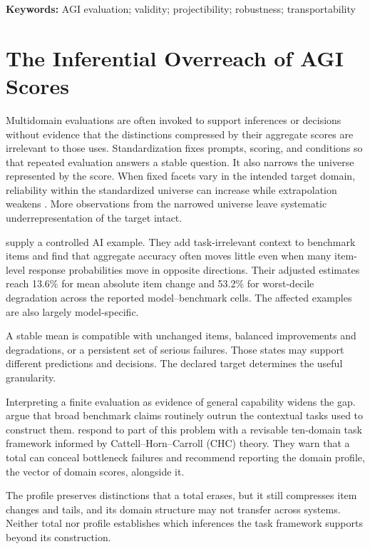 \documentclass[12pt]{article}
\begin{document}
\noindent\textbf{Keywords:} AGI evaluation; validity; projectibility; robustness; transportability

\section{The Inferential Overreach of AGI Scores}\label{sec:problem}

Multidomain evaluations are often invoked to support inferences or decisions without evidence that the distinctions compressed by their aggregate scores are irrelevant to those uses. Standardization fixes prompts, scoring, and conditions so that repeated evaluation answers a stable question. It also narrows the universe represented by the score. When fixed facets vary in the intended target domain, reliability within the standardized universe can increase while extrapolation weakens \parencites[22--31]{kane2013validating}[132--135]{brennan2001generalizability}. More observations from the narrowed universe leave systematic underrepresentation of the target intact.

\textcite{zhang2026illusionRobustness} supply a controlled AI example. They add task-irrelevant context to benchmark items and find that aggregate accuracy often moves little even when many item-level response probabilities move in opposite directions. Their adjusted estimates reach 13.6\% for mean absolute item change and 53.2\% for worst-decile degradation across the reported model--benchmark cells. The affected examples are also largely model-specific.

A stable mean is compatible with unchanged items, balanced improvements and degradations, or a persistent set of serious failures. Those states may support different predictions and decisions. The declared target determines the useful granularity.

Interpreting a finite evaluation as evidence of general capability widens the gap. \textcite{raji2021whole} argue that broad benchmark claims routinely outrun the contextual tasks used to construct them. \textcite{hendrycks2025agi} respond to part of this problem with a revisable ten-domain task framework informed by Cattell--Horn--Carroll (CHC) theory. They warn that a total can conceal bottleneck failures and recommend reporting the domain profile, the vector of domain scores, alongside it.

The profile preserves distinctions that a total erases, but it still compresses item changes and tails, and its domain structure may not transfer across systems. Neither total nor profile establishes which inferences the task framework supports beyond its construction.
\end{document}
